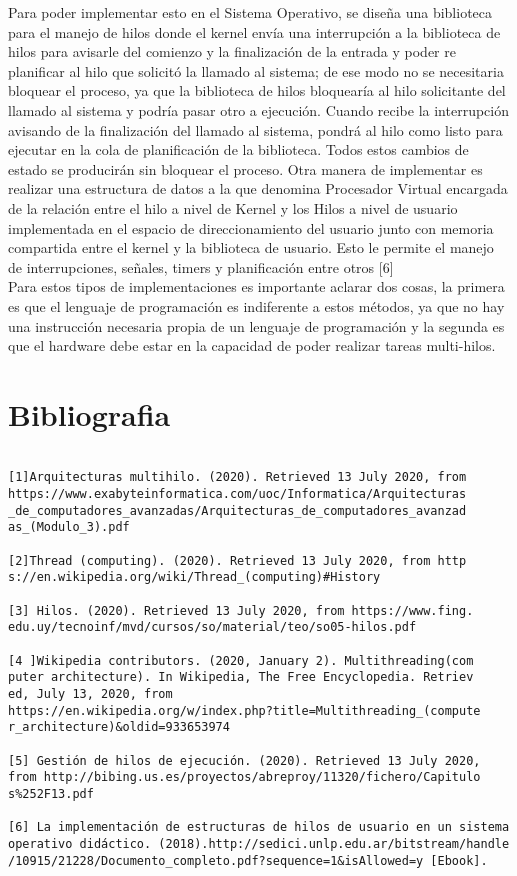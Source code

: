 \documentclass{article}
\begin{document}
Para poder implementar esto en el Sistema Operativo, se diseña una biblioteca para el manejo de hilos donde el kernel envía una interrupción a la biblioteca de hilos para avisarle del comienzo y la finalización de la entrada y poder re planificar al hilo que solicitó la llamado al sistema; de ese modo no se necesitaria bloquear el proceso, ya que la biblioteca de hilos bloquearía al hilo solicitante del llamado al sistema y podría pasar otro a ejecución. Cuando recibe la interrupción avisando de la finalización del llamado al sistema, pondrá al hilo como listo para ejecutar en la cola de planificación de la biblioteca. Todos estos cambios de estado se producirán sin bloquear el proceso. Otra manera de implementar es realizar una estructura de datos a la que denomina Procesador Virtual encargada de la relación entre el hilo a nivel de Kernel y los Hilos a nivel de usuario implementada en el espacio de direccionamiento del usuario junto con memoria compartida entre el kernel y la biblioteca de usuario. Esto le permite el manejo de interrupciones, señales, timers y planificación entre otros [6]\\

Para estos tipos de implementaciones es importante aclarar dos cosas, la primera es que el lenguaje de programación es indiferente a estos métodos, ya que no hay una instrucción necesaria propia de un lenguaje de programación y la segunda es que el hardware debe estar en la capacidad de poder realizar tareas multi-hilos.

\section*{Bibliografia}

\small 

\begin{verbatim}
 
[1]Arquitecturas multihilo. (2020). Retrieved 13 July 2020, from 
https://www.exabyteinformatica.com/uoc/Informatica/Arquitecturas
_de_computadores_avanzadas/Arquitecturas_de_computadores_avanzad
as_(Modulo_3).pdf

[2]Thread (computing). (2020). Retrieved 13 July 2020, from http
s://en.wikipedia.org/wiki/Thread_(computing)#History

[3] Hilos. (2020). Retrieved 13 July 2020, from https://www.fing.
edu.uy/tecnoinf/mvd/cursos/so/material/teo/so05-hilos.pdf

[4 ]Wikipedia contributors. (2020, January 2). Multithreading(com
puter architecture). In Wikipedia, The Free Encyclopedia. Retriev
ed, July 13, 2020, from
https://en.wikipedia.org/w/index.php?title=Multithreading_(compute
r_architecture)&oldid=933653974

[5] Gestión de hilos de ejecución. (2020). Retrieved 13 July 2020, 
from http://bibing.us.es/proyectos/abreproy/11320/fichero/Capitulo
s%252F13.pdf

[6] La implementación de estructuras de hilos de usuario en un sistema 
operativo didáctico. (2018).http://sedici.unlp.edu.ar/bitstream/handle
/10915/21228/Documento_completo.pdf?sequence=1&isAllowed=y [Ebook].

\end{verbatim}
\end{document}
